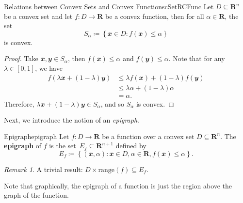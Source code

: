 \documentclass[math, code]{amznotes}
\theoremstyle{remark}
\newtheorem*{remark}{Remark}
\begin{document}
\begin{probox}{Relations between Convex Sets and Convex Functions}{cSetRCFunc}
    Let $D \subseteq \mathbf{R}^n$ be a convex set and let $f \colon D \to \mathbf{R}$ be a convex function, then for all $\alpha \in \mathbf{R}$, the set
    \begin{displaymath}
        S_\alpha \coloneqq \left\{\mathbfit{x} \in D \colon f(\mathbfit{x}) \leq \alpha\right\}
    \end{displaymath}
    is convex.
    \tcblower   
    \begin{proof}
        Take $\mathbfit{x}, \mathbfit{y} \in S_\alpha$, then $f(\mathbfit{x}) \leq \alpha$ and $f(\mathbfit{y}) \leq \alpha$. Note that for any $\lambda \in [0, 1]$, we have
        \begin{align*}
            f\left(\lambda\mathbfit{x} + (1 - \lambda)\mathbfit{y}\right) & \leq \lambda f(\mathbfit{x}) + (1 - \lambda)f(\mathbfit{y}) \\
            & \leq \lambda\alpha + (1 - \lambda)\alpha \\
            & = \alpha.
        \end{align*}
        Therefore, $\lambda\mathbfit{x} + (1 - \lambda)\mathbfit{y} \in S_\alpha$, and so $S_\alpha$ is convex.
    \end{proof}
\end{probox}
Next, we introduce the notion of an \textit{epigraph}.
\begin{dfnbox}{Epigraph}{epigraph}
    Let $f \colon D \to \mathbf{R}$ be a function over a convex set $D \subseteq \mathbf{R}^n$. The {\color{red} \textbf{epigraph}} of $f$ is the set~$E_f \subseteq \mathbf{R}^{n + 1}$ defined by
    \begin{displaymath}
        E_f \coloneqq \left\{(\mathbfit{x}, \alpha) \colon \mathbfit{x} \in D, \alpha \in \mathbf{R}, f(\mathbfit{x}) \leq \alpha\right\}.
    \end{displaymath}
\end{dfnbox}
\begin{notebox}
    \begin{remark}
        A trivial result: $D \times \mathrm{range}(f) \subseteq E_f$.
    \end{remark}
\end{notebox}
Note that graphically, the epigraph of a function is just the region above the graph of the function.
\end{document}
